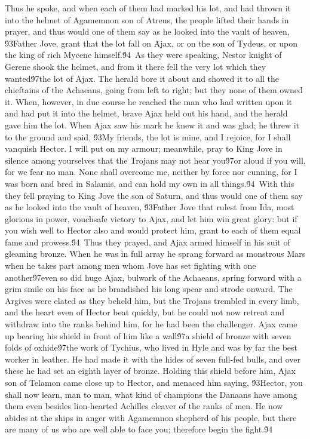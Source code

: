 {Thus he spoke, and when each of them had marked his lot, and had thrown it into the helmet of Agamemnon son of Atreus, the people lifted their hands in prayer, and thus would one of them say as he looked into the vault of heaven, \'93Father Jove, grant that the lot fall on Ajax, or on the son of Tydeus, or upon the king of rich Mycene himself.\'94\
As they were speaking, Nestor knight of Gerene shook the helmet, and from it there fell the very lot which they wanted\'97the lot of Ajax. The herald bore it about and showed it to all the chieftains of the Achaeans, going from left to right; but they none of them owned it. When, however, in due course he reached the man who had written upon it and had put it into the helmet, brave Ajax held out his hand, and the herald gave him the lot. When Ajax saw his mark he knew it and was glad; he threw it to the ground and said, \'93My friends, the lot is mine, and I rejoice, for I shall vanquish Hector. I will put on my armour; meanwhile, pray to King Jove in silence among yourselves that the Trojans may not hear you\'97or aloud if you will, for we fear no man. None shall overcome me, neither by force nor cunning, for I was born and bred in Salamis, and can hold my own in all things.\'94\
With this they fell praying to King Jove the son of Saturn, and thus would one of them say as he looked into the vault of heaven, \'93Father Jove that rulest from Ida, most glorious in power, vouchsafe victory to Ajax, and let him win great glory: but if you wish well to Hector also and would protect him, grant to each of them equal fame and prowess.\'94\
Thus they prayed, and Ajax armed himself in his suit of gleaming bronze. When he was in full array he sprang forward as monstrous Mars when he takes part among men whom Jove has set fighting with one another\'97even so did huge Ajax, bulwark of the Achaeans, spring forward with a grim smile on his face as he brandished his long spear and strode onward. The Argives were elated as they beheld him, but the Trojans trembled in every limb, and the heart even of Hector beat quickly, but he could not now retreat and withdraw into the ranks behind him, for he had been the challenger. Ajax came up bearing his shield in front of him like a wall\'97a shield of bronze with seven folds of oxhide\'97the work of Tychius, who lived in Hyle and was by far the best worker in leather. He had made it with the hides of seven full-fed bulls, and over these he had set an eighth layer of bronze. Holding this shield before him, Ajax son of Telamon came close up to Hector, and menaced him saying, \'93Hector, you shall now learn, man to man, what kind of champions the Danaans have among them even besides lion-hearted Achilles cleaver of the ranks of men. He now abides at the ships in anger with Agamemnon shepherd of his people, but there are many of us who are well able to face you; therefore begin the fight.\'94\
}
